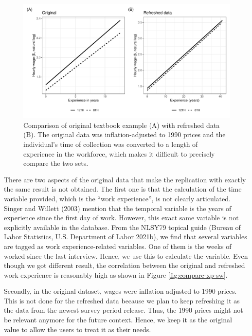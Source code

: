 \documentclass{article}
\begin{document}
\begin{figure}

{\centering \includegraphics[width=1\linewidth]{figures/plotting-sw-do-1} 

}

\caption{Comparison of original textbook example (A) with refreshed data (B). The original data was inflation-adjusted to 1990 prices and the individual's time of collection was converted to a length of experience in the workforce, which makes it difficult to precisely compare the two sets.}\label{fig:plotting-sw-do}
\end{figure}

There are two aspects of the original data that make the replication with exactly the same result is not obtained. The first one is that the calculation of the time variable provided, which is the ``work experience'', is not clearly articulated. Singer and Willett (2003) mention that the temporal variable is the years of experience since the first day of work. However, this exact same variable is not explicitly available in the database. From the NLSY79 topical guide (Bureau of Labor Statistics, U.S. Department of Labor 2021b), we find that several variables are tagged as work experience-related variables. One of them is the weeks of worked since the last interview. Hence, we use this to calculate the variable. Even though we got different result, the correlation between the original and refreshed work experience is reasonably high as shown in Figure \ref{fig:compare-xp-sw}.

Secondly, in the original dataset, wages were inflation-adjusted to 1990 prices. This is not done for the refreshed data because we plan to keep refreshing it as the data from the newest survey period release. Thus, the 1990 prices might not be relevant anymore for the future context. Hence, we keep it as the original value to allow the users to treat it as their needs.
\end{document}
